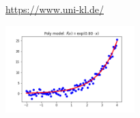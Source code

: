 
\url{https://www.uni-kl.de/}

\includegraphics[width=5cm]{../ressources/exercises/add_material/dummy1/modelvsdata.png}


